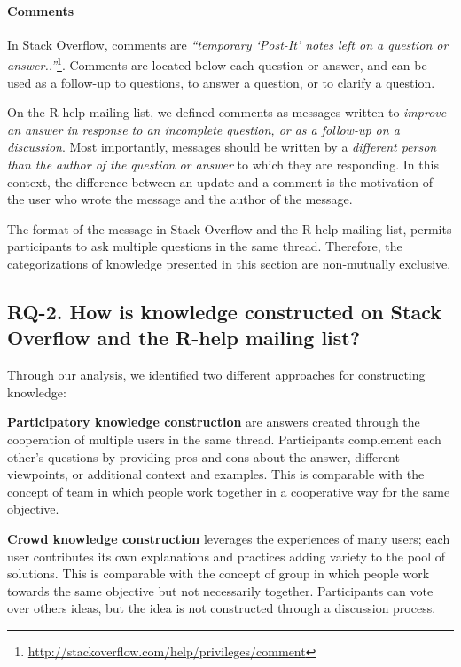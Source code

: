 \paragraph*{Comments}
In Stack Overflow, comments are \textit{``temporary `Post-It' notes left on a question or answer..''}\footnote{\url{http://stackoverflow.com/help/privileges/comment}}.
	Comments are located below each question or answer, and can be used as a follow-up to questions, to answer a question, or to clarify a question.

	On the R-help mailing list, we defined comments as messages written to \emph{improve an answer in response to an incomplete question, or as a follow-up on a discussion}.
	Most importantly, messages should be written by a \emph{different person than the author of the question or answer} to which they are responding.
	In this context, the difference between an update and a comment is the motivation of the user who wrote the message and the author of the message.

	The format of the message in Stack Overflow and the R-help mailing list, permits participants to ask multiple questions in the same thread.
	Therefore, the categorizations of knowledge presented in this section are non-mutually exclusive.

\subsection{RQ-2. How is knowledge constructed on Stack Overflow and the R-help mailing list?}
\label{sec:rq2}

    Through our analysis, we identified two different approaches for constructing knowledge:

        \noindent\textbf{Participatory knowledge construction} are answers created through the cooperation of multiple users in the same thread.
        Participants complement each other's questions by providing pros and cons about the answer, different viewpoints, or additional context and examples.
        This is comparable with the concept of team in which people work together in a cooperative way for the same objective.

\noindent        \textbf{Crowd knowledge construction} leverages the experiences of many users; each user contributes its own explanations and practices adding variety to the pool of solutions.
        This is comparable with the concept of group in which people work towards the same objective but not necessarily together.
        Participants can vote over others ideas, but the idea is not constructed through a discussion process.
    
